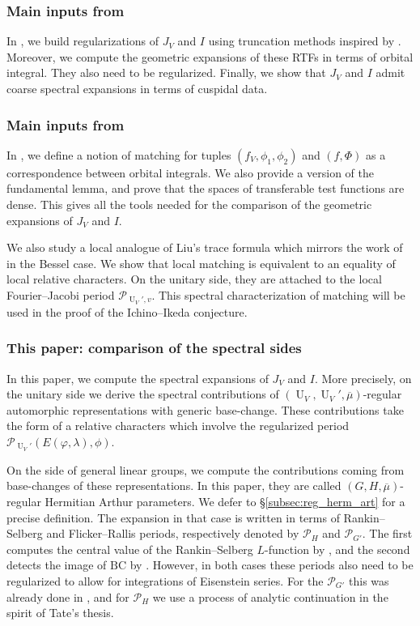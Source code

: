 \documentclass[letterpaper,11pt]{amsart}
\newcommand{\cP}{\mathcal{P}}
\newcommand{\<}{\negthickspace}
\DeclareMathOperator{\U}{U}
\theoremstyle{definition}
\theoremstyle{plain}
\theoremstyle{remark}
\numberwithin{equation}{section}
\begin{document}
\subsubsection{Main inputs from \cite{BLX1}}

In \cite{BLX1}, we build regularizations of $J_V$ and $I$ using truncation methods inspired by \cite{Zydor3}. Moreover, we compute the geometric expansions of these RTFs in terms of orbital integral. They also need to be regularized. Finally, we show that $J_V$ and $I$ admit coarse spectral expansions in terms of cuspidal data.

\subsubsection{Main inputs from \cite{BLX2}}

In \cite{BLX2}, we define a notion of matching for tuples $(f_V,\phi_1,\phi_2)$ and $(f,\Phi)$ as a correspondence between orbital integrals. We also provide a version of the fundamental lemma, and prove that the spaces of transferable test functions are dense. This gives all the tools needed for the comparison of the geometric expansions of $J_V$ and $I$.

We also study a local analogue of Liu's trace formula which mirrors the work of \cite{BP} in the Bessel case. We show that local matching is equivalent to an equality of local relative characters. On the unitary side, they are attached to the local Fourier--Jacobi period $\cP_{\U_V',v}$. This spectral characterization of matching will be used in the proof of the Ichino--Ikeda conjecture.

\subsubsection{This paper: comparison of the spectral sides}

In this paper, we compute the spectral expansions of $J_V$ and $I$. More precisely, on the unitary side we derive the spectral contributions of $(\U_V,\U_V',\overline{\mu})$-regular automorphic representations with generic base-change. These contributions take the form of a relative characters which involve the regularized period $\cP_{\U_V'}(E(\varphi,\lambda),\phi)$. 

On the side of general linear groups, we compute the contributions coming from base-changes of these representations. In this paper, they are called $(G,H,\overline{\mu})$-regular Hermitian Arthur parameters. We defer to \S\ref{subsec:reg_herm_art} for a precise definition. The expansion in that case is written in terms of Rankin--Selberg and Flicker--Rallis periods, respectively denoted by $\cP_H$ and $\cP_{G'}$. The first computes the central value of the Rankin--Selberg $L$-function by \cite{JPSS83}, and the second detects the image of $\mathrm{BC}$ by \cite{Fli}. However, in both cases these periods also need to be regularized to allow for integrations of Eisenstein series. For the $\cP_{G'}$ this was already done in \cite{BPC22}, and for $\cP_H$ we use a process of analytic continuation in the spirit of Tate's thesis.
\end{document}
